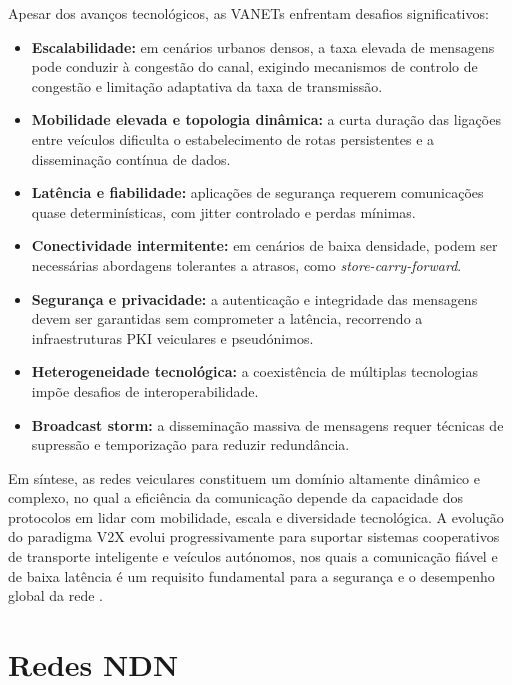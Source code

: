 Apesar dos avanços tecnológicos, as \gls{VANETs} enfrentam desafios significativos:
\begin{itemize}
    \item \textbf{Escalabilidade:} em cenários urbanos densos, a taxa elevada de mensagens pode conduzir à congestão do canal, exigindo mecanismos de controlo de congestão e limitação adaptativa da taxa de transmissão.
    \item \textbf{Mobilidade elevada e topologia dinâmica:} a curta duração das ligações entre veículos dificulta o estabelecimento de rotas persistentes e a disseminação contínua de dados.
    \item \textbf{Latência e fiabilidade:} aplicações de segurança requerem comunicações quase determinísticas, com jitter controlado e perdas mínimas.
    \item \textbf{Conectividade intermitente:} em cenários de baixa densidade, podem ser necessárias abordagens tolerantes a atrasos, como \textit{store-carry-forward}.
    \item \textbf{Segurança e privacidade:} a autenticação e integridade das mensagens devem ser garantidas sem comprometer a latência, recorrendo a infraestruturas PKI veiculares e pseudónimos.
    \item \textbf{Heterogeneidade tecnológica:} a coexistência de múltiplas tecnologias impõe desafios de interoperabilidade.
    \item \textbf{Broadcast storm:} a disseminação massiva de mensagens requer técnicas de supressão e temporização para reduzir redundância.
\end{itemize}

Em síntese, as redes veiculares constituem um domínio altamente dinâmico e complexo, no qual a eficiência da comunicação depende da capacidade dos protocolos em lidar com mobilidade, escala e diversidade tecnológica. A evolução do paradigma V2X evolui progressivamente para suportar sistemas
cooperativos de transporte inteligente e veículos autónomos, nos quais a comunicação fiável e de baixa
latência é um requisito fundamental para a segurança e o desempenho global da rede \cite{halim_research_2023}.


\section{Redes \gls{NDN}}
\label{sec:redes_NDN}

